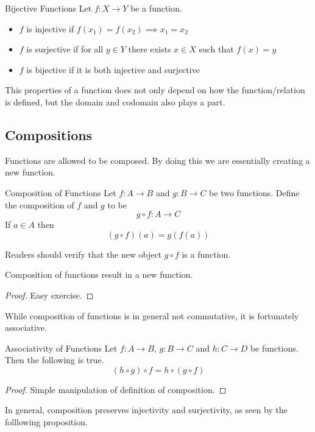 \documentclass[a4paper]{article}
\begin{document}
\begin{defn}{Bijective Functions}{} Let $f:X\to Y$ be a function. 
\begin{itemize}
\item $f$ is injective if $f(x_1)=f(x_2)\implies x_1=x_2$
\item $f$ is surjective if for all $y\in Y$ there exists $x\in X$ such that $f(x)=y$
\item $f$ is bijective if it is both injective and surjective
\end{itemize}
\end{defn}

This properties of a function does not only depend on how the function/relation is defined, but the domain and codomain also plays a part. 

\subsection{Compositions}
Functions are allowed to be composed. By doing this we are essentially creating a new function. 
\begin{defn}{Composition of Functions}{} Let $f:A\to B$ and $g:B\to C$ be two functions. Define the composition of $f$ and $g$ to be $$g\circ f:A\to C$$ If $a\in A$ then $$(g\circ f)(a)=g(f(a))$$
\end{defn}

Readers should verify that the new object $g\circ f$ is a function. 

\begin{lmm}{}{} Composition of functions result in a new function. \tcbline
\begin{proof}
Easy exercise. 
\end{proof}
\end{lmm}

While composition of functions is in general not commutative, it is fortunately associative. 

\begin{prp}{Associativity of Functions}{} Let $f:A\to B$, $g:B\to C$ and $h:C\to D$ be functions. Then the following is true. $$(h\circ g)\circ f=h\circ(g\circ f)$$\tcbline
\begin{proof}
Simple manipulation of definition of composition. 
\end{proof}
\end{prp}

In general, composition preserves injectivity and surjectivity, as seen by the folllowing proposition. 
\end{document}
